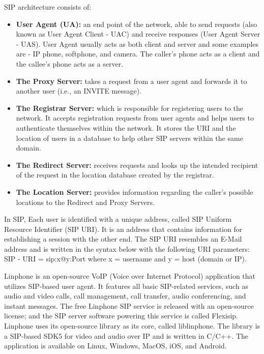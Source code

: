     \noindent SIP architecture consists of:
    \begin{itemize}
        \item \textbf {User Agent (UA):} an end point of the network, able to send requests (also known as User Agent Client - UAC) 
        and receive responses (User Agent Server - UAS). User Agent usually acts as both client and server and some examples 
        are - IP phone, softphone, and camera. The caller’s phone acts as a client and the callee’s phone acts as a server.
        \item \textbf {The Proxy Server:} takes a request from a user agent and forwards it to another user (i.e., an INVITE message).
        \item \textbf {The Registrar Server:} which is responsible for registering users to the network. It accepts registration requests from 
        user agents and helps users to authenticate themselves within the network. It stores the URI and the location of users in a database 
        to help other SIP servers within the same domain.
        \item \textbf {The Redirect Server:} receives requests and looks up the intended recipient of the request in the location database created by the registrar. 
        \item \textbf {The Location Server:} provides information regarding the caller’s possible locations to the Redirect and Proxy Servers.
    \end{itemize}
    \noindent In SIP, Each user is identified with a unique address, called SIP Uniform Resource Identifier (SIP URI). It is an address that contains information for establishing a session with the other end. The SIP URI resembles an E-Mail address and is written in the syntax below with the following URI parameters: 
    SIP - URI = sip:x@y:Port  where x = username and y = host (domain or IP).

    Linphone is an open-source VoIP (Voice over Internet Protocol) application that utilizes SIP-based user agent. 
    It features all basic SIP-related services, such as audio and video calls, call management, call transfer, audio conferencing, and instant messages. 
    The free Linphone SIP service is released with an open-source license; and the SIP server software powering this service is called Flexisip. 
    Linphone uses its open-source library as its core, called liblinphone. 
    The library is a SIP-based SDK5 for video and audio over IP and is written in C/C++. 
    The application is available on Linux, Windows, MacOS, iOS, and Android.


